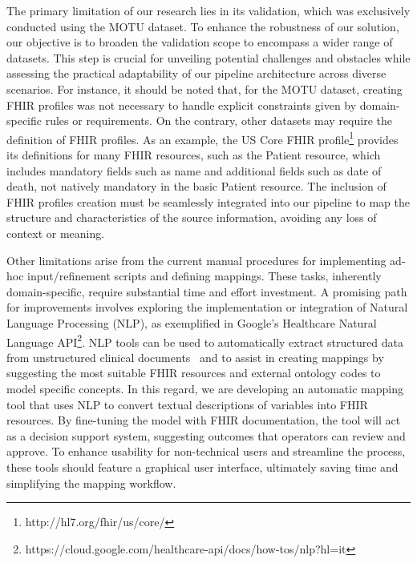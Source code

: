 The primary limitation of our research lies in its validation, which was exclusively conducted using the MOTU dataset. To enhance the robustness of our solution, our objective is to broaden the validation scope to encompass a wider range of datasets. This step is crucial for unveiling potential challenges and obstacles while assessing the practical adaptability of our pipeline architecture across diverse scenarios. For instance, it should be noted that, for the MOTU dataset, creating FHIR profiles was not necessary to handle explicit constraints given by domain-specific rules or requirements. On the contrary, other datasets may require the definition of FHIR profiles. As an example, the US Core FHIR profile\footnote{http://hl7.org/fhir/us/core/} provides its definitions for many FHIR resources, such as the Patient resource, which includes mandatory fields such as name and additional fields such as date of death, not natively mandatory in the basic Patient resource. The inclusion of FHIR profiles creation must be seamlessly integrated into our pipeline to map the structure and characteristics of the source information, avoiding any loss of context or meaning.

Other limitations arise from the current manual procedures for implementing ad-hoc input/refinement scripts and defining mappings. These tasks, inherently domain-specific, require substantial time and effort investment. A promising path for improvements involves exploring the implementation or integration of Natural Language Processing (NLP), as exemplified in Google's Healthcare Natural Language API\footnote{https://cloud.google.com/healthcare-api/docs/how-tos/nlp?hl=it }. NLP tools can be used to automatically extract structured data from unstructured clinical documents~\cite{hong_developing_2019} and to assist in creating mappings by suggesting the most suitable FHIR resources and external ontology codes to model specific concepts. In this regard, we are developing an automatic mapping tool that uses NLP to convert textual descriptions of variables into FHIR resources. By fine-tuning the model with FHIR documentation, the tool will act as a decision support system, suggesting outcomes that operators can review and approve. To enhance usability for non-technical users and streamline the process, these tools should feature a graphical user interface, ultimately saving time and simplifying the mapping workflow.

